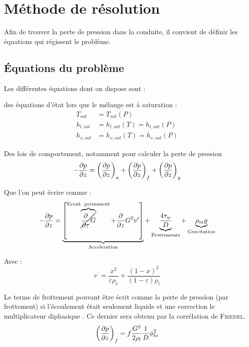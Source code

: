 \section{Méthode de résolution\label{section:res}}
Afin de trouver la perte de pression dans la conduite, il convient de définir les équations qui régissent le problème.
\subsection{Équations du problème}
Les différentes équations dont on dispose sont :

des équations d'état lors que le mélange est à saturation :
\begin{align}
    T_{sat} &= T_{sat}(P) \\
    h_{l,sat} &= h_{l,sat}(T) = h_{l,sat}(P) \\
    h_{v,sat} &= h_{v,sat}(T) = h_{v,sat}(P)
\end{align}

Des lois de comportement, notamment pour calculer la perte de pression
\begin{equation}
     -\pder[p]{z} = \left(\pder[p]{z} \right)_{a} + \left(\pder[p]{z} \right)_{f} + \left(\pder[p]{z} \right)_{g}
\end{equation}

Que l'on peut écrire comme :
\begin{equation}
    -\pder[p]{z} = \underbrace{\left[\overbrace{\cancel{\frac{\partial}{\partial \tau} G}}^{\text{Ecoul. permanent}}+\frac{\partial}{\partial z} G^{2} v^{\prime}\right]}_{\text{Acceleration}}+\underbrace{\frac{4 \tau_{w}}{D}}_{\text{Frottements}}+\underbrace{\rho_{m} g}_{\text{Gravitation}}
\end{equation}

Avec :
\begin{equation}
    v^{\prime}=\frac{x^{2}}{\varepsilon \rho_{v}}+\frac{(1-x)^{2}}{(1-\varepsilon) \rho_{l}}
\end{equation}

Le terme de frottement pouvant être écrit comme la perte de pression (par frottement) si l'écoulement était seulement liquide et une correction le \og multiplicateur diphasique \fg{}. Ce dernier sera obtenu par la corrélation de \textsc{Friedel}.
\begin{equation}
    \left(\pder[p]{z} \right)_{f} = f\frac{G^2}{2 \rho_l}\frac{1}{D} \phi_{lo}^2
\end{equation}

